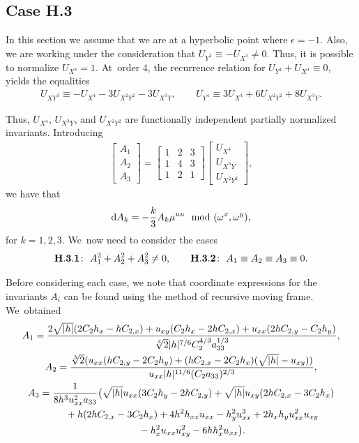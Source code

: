 \documentclass[10pt,a4paper]{amsart}
\numberwithin{equation}{section}
\begin{document}
\subsection{Case H.3}

In this section we assume that we are at a hyperbolic point where $\epsilon=-1$. Also, we are working under the consideration that $U_{Y^3} \equiv - U_{X^3}\neq 0$. Thus, it is possible to normalize $U_{X^3}=1$. At~order 4, the recurrence relation for $U_{Y^3} + U_{X^3}\equiv 0$, yields the equalities
\begin{gather*}
U_{XY^3} \equiv - U_{X^4} - 3U_{X^2Y^2} - 3U_{X^3Y}, \qquad
U_{Y^4} \equiv 3U_{X^4}+6U_{X^2Y^2} + 8U_{X^3Y}.
\end{gather*}

{\samepage
Thus, $U_{X^4}$, $U_{X^3Y}$, and $U_{X^2Y^2}$ are functionally independent partially normalized invariants. Introducing
\begin{gather*}
\begin{bmatrix}
A_1 \\ A_2 \\ A_3
\end{bmatrix} =
\begin{bmatrix}
1 & 2 & 3 \\
1 & 4 & 3 \\
1 & 2 & 1
\end{bmatrix}
\begin{bmatrix}
U_{X^4} \\ U_{X^3Y} \\ U_{X^2Y^2}
\end{bmatrix}\!,
\end{gather*}
we have that
\begin{gather*}
{\rm d}A_k = -\frac{k}{3} A_k \mu^{uu} \mod(\omega^x,\omega^y),
\end{gather*}
for $k=1,2,3$. We~now need to consider the cases
\begin{gather*}
 {\bf H.3.1}\colon\ A_1^2+A_2^2+A_3^2\neq 0,\qquad
 {\bf H.3.2}\colon\ A_1\equiv A_2\equiv A_3\equiv 0.
\end{gather*}
}


Before considering each case, we note that coordinate expressions for the invariants $A_i$ can be found using the method of recursive moving frame. We~obtained
\begin{gather}
A_1 = \frac{2\sqrt{|h|}(2C_2h_x-hC_{2,x}) + u_{xy}(C_2h_x-2hC_{2,x}) + u_{xx}(2hC_{2,y} - C_2h_y)}{\sqrt[3]{2}|h|^{7/6}C_2^{4/3}a_{33}^{1/3}},\nonumber
\\
A_2 = \frac{\sqrt[3]{2}(u_{xx}(hC_{2,y} - 2C_2h_y)+(hC_{2,x}-2C_2h_x)(\sqrt{|h|}-u_{xy}))}{u_{xx}|h|^{11/6}(C_2a_{33})^{2/3}},\nonumber
\\
A_3 = \frac{1}{8h^3 u_{xx}^2 a_{33}}\big(\sqrt{|h|}u_{xx}(3C_2h_y - 2hC_{2,y})+\sqrt{|h|}u_{xy}(2hC_{2,x}-3C_2h_x)\nonumber
\\ \hphantom{A_3 =}
{}+h(2hC_{2,x}-3C_2h_x)+4h^2h_{xx}u_{xx}-h_y^2u_{xx}^3+2h_xh_yu_{xx}^2u_{xy}\nonumber
\\ \hphantom{A_3 =}
{}-h_x^2u_{xx}u_{xy}^2-6hh_x^2u_{xx}\big).
\label{eq:A invariants}
\end{gather}
\end{document}

